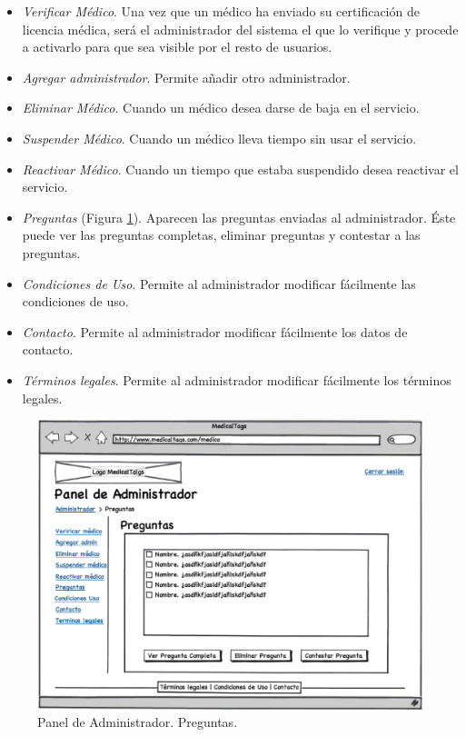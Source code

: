 		\begin{itemize}
			\item \textit{Verificar Médico}. Una vez que un médico ha enviado su certificación de licencia médica, será el administrador del sistema el que lo verifique y procede a activarlo para que sea visible por el resto de usuarios.
			\item \textit{Agregar administrador}. Permite añadir otro administrador.
			\item \textit{Eliminar Médico}. Cuando un médico desea darse de baja en el servicio.
			\item \textit{Suspender Médico}. Cuando un médico lleva tiempo sin usar el servicio.
			\item \textit{Reactivar Médico}. Cuando un tiempo que estaba suspendido desea reactivar el servicio.
			\item \textit{Preguntas} (Figura \ref{fig:admin_preguntas}). Aparecen las preguntas enviadas al administrador. Éste puede ver las preguntas completas, eliminar preguntas y contestar a las preguntas.
			\item \textit{Condiciones de Uso}. Permite al administrador modificar fácilmente las condiciones de uso.
			\item \textit{Contacto}. Permite al administrador modificar fácilmente los datos de contacto.
			\item \textit{Términos legales}. Permite al administrador modificar fácilmente los términos legales.
		\end{itemize}
	
		\begin{figure}[H]
		  \centering
		    \includegraphics[width=12cm]{img/eps/99_Administrador.eps}
		  \caption{Panel de Administrador. Preguntas.}
		  \label{fig:admin_preguntas}
		\end{figure}
	

